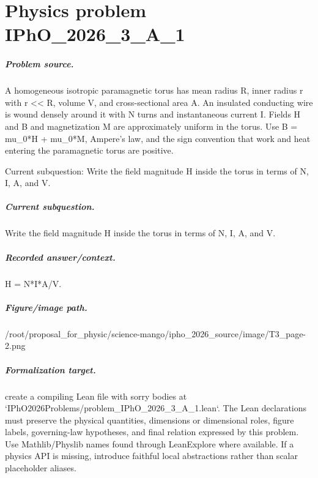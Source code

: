
\chapter{Physics problem IPhO\_2026\_3\_A\_1}
\label{ch:IPhO2026Problems_problem_IPhO_2026_3_A_1}

\paragraph{Problem source.}
A homogeneous isotropic paramagnetic torus has mean radius R, inner radius r
with r << R, volume V, and cross-sectional area A.  An insulated conducting
wire is wound densely around it with N turns and instantaneous current I.
Fields H and B and magnetization M are approximately uniform in the torus.
Use B = mu\_0*H + mu\_0*M, Ampere's law, and the sign convention that work and
heat entering the paramagnetic torus are positive.

Current subquestion:
Write the field magnitude H inside the torus in terms of N, I, A, and V.

\paragraph{Current subquestion.}
Write the field magnitude H inside the torus in terms of N, I, A, and V.

\paragraph{Recorded answer/context.}
H = N*I*A/V.

\paragraph{Figure/image path.}
/root/proposal\_for\_physic/science-mango/ipho\_2026\_source/image/T3\_page-2.png

\paragraph{Formalization target.}
create a compiling Lean file with sorry bodies at `IPhO2026Problems/problem\_IPhO\_2026\_3\_A\_1.lean`. The Lean declarations must preserve the physical quantities, dimensions or dimensional roles, figure labels, governing-law hypotheses, and final relation expressed by this problem.
Use Mathlib/Physlib names found through LeanExplore where available. If a physics API is missing, introduce faithful local abstractions rather than scalar placeholder aliases.

